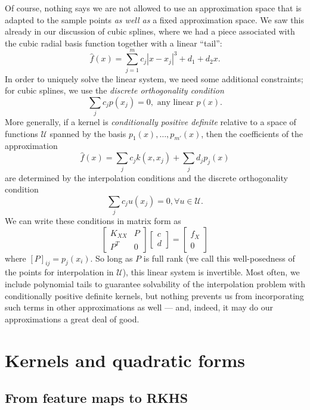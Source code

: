 \documentclass[12pt, leqno]{article} %
\begin{document}
Of course, nothing says we are not allowed to use an approximation
space that is adapted to the sample points {\em as well as} a fixed
approximation space.  We saw this already in our discussion of cubic
splines, where we had a piece associated with the cubic radial basis
function together with a linear ``tail'':
\[
  \hat{f}(x) = \sum_{j=1}^m c_j |x-x_j|^3 + d_1 + d_2 x.
\]
In order to uniquely solve the linear system, we need some additional
constraints; for cubic splines, we use the
{\em discrete orthogonality condition}
\[
  \sum_j c_j p(x_j) = 0, \mbox{ any linear } p(x).
\]
More generally, if a kernel is {\em conditionally positive definite}
relative to a space of functions $\mathcal{U}$ spanned by the basis
$p_1(x), \ldots, p_{m'}(x)$, then the coefficients of the
approximation
\[
  \hat{f}(x) = \sum_j c_j k(x,x_j) + \sum_j d_j p_j(x)
\]
are determined by the interpolation conditions and the
discrete orthogonality condition
\[
  \sum_j c_j u(x_j) = 0, \forall u \in \mathcal{U}.
\]
We can write these conditions in matrix form as
\[
  \begin{bmatrix} K_{XX} & P \\ P^T & 0 \end{bmatrix}
  \begin{bmatrix} c \\ d \end{bmatrix} =
  \begin{bmatrix} f_X \\ 0 \end{bmatrix}
\]
where $[P]_{ij} = p_j(x_i)$.  So long as $P$ is full rank (we call
this well-posedness of the points for interpolation in $\mathcal{U}$),
this linear system is invertible.  Most often, we include polynomial
tails to guarantee solvability of the interpolation problem with
conditionally positive definite kernels, but nothing prevents us from
incorporating such terms in other approximations as well --- and,
indeed, it may do our approximations a great deal of good.

\section{Kernels and quadratic forms}


\subsection{From feature maps to RKHS}
\end{document}
